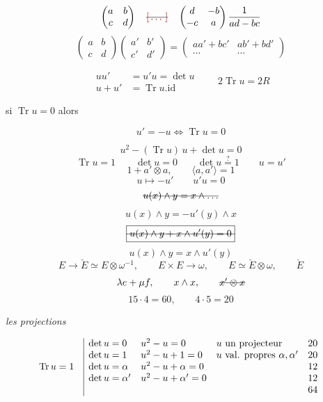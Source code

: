 \documentclass[11pt,a4paper]{article}
\begin{document}
\[
\begin{pmatrix} a & b \\ c & d \end{pmatrix}
\quad \text{\struck{\ill{}}} \quad
\begin{pmatrix} d & -b \\ -c & a \end{pmatrix} \frac{1}{ad-bc}
\]
\[
\begin{pmatrix} a & b \\ c & d \end{pmatrix}
\begin{pmatrix} a' & b' \\ c' & d' \end{pmatrix}
= \begin{pmatrix} aa' + bc' & ab' + bd' \\ \cdots & \cdots \end{pmatrix}
\]

\[
\boxed{\begin{aligned}
u u' &= u' u = \det u \\
u + u' &= \operatorname{Tr} u . \mathrm{id}
\end{aligned}}
\qquad 2 \operatorname{Tr} u = 2R
\]

 \quad si $\operatorname{Tr} u = 0$ alors

\[
u' = -u \iff \operatorname{Tr} u = 0
\]

\[
u^2 - (\operatorname{Tr} u)\, u + \det u = 0
\]
\[
\operatorname{Tr} u = 1 \qquad \det u = 0 \qquad \det u \overset{?}{=} 1
\qquad u = u'
\]
\[
1 + a' \otimes a, \qquad \langle a, a' \rangle = 1
\]
\[
u \longmapsto -u' \qquad u' u = 0
\]
\[
\text{\struck{$u(x) \wedge y = x \wedge \ldots$}}
\]
\[
u(x) \wedge y = -u'(y) \wedge x
\]
\[
\text{\struck{$\boxed{u(x) \wedge y + x \wedge u'(y) = 0}$}}
\]
\[
\boxed{u(x) \wedge y = x \wedge u'(y)}
\]
\[
E \to \check{E} \simeq E \otimes \omega^{-1}, \qquad
E \times E \to \omega, \qquad
E \simeq \check{E} \otimes \omega, \qquad \check{E}
\]
\[
\lambda e + \mu f, \qquad x \wedge x, \qquad
\text{\struck{$x' \otimes x$}}
\]
\[
15 \cdot 4 = 60, \qquad 4 \cdot 5 = 20
\]

\emph{les projections}

\[
\operatorname{Tr} u = 1 \quad
\begin{array}{|lll r}
\det u = 0 & u^2 - u = 0 & u \text{ un projecteur} & 20 \\
\det u = 1 & u^2 - u + 1 = 0 & u \text{ val. propres } \alpha, \alpha' & 20 \\
\det u = \alpha & u^2 - u + \alpha = 0 & & 12 \\
\det u = \alpha' & u^2 - u + \alpha' = 0 & & 12 \\
 & & & 64
\end{array}
\]
\end{document}
